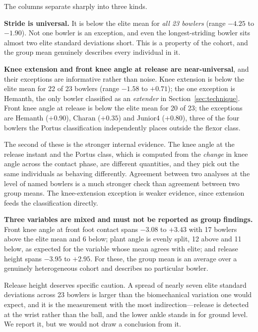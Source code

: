 \documentclass[11pt,a4paper]{article}
\begin{document}


The columns separate sharply into three kinds.

\textbf{Stride is universal.} It is below the elite mean for \emph{all 23
bowlers} (range $-4.25$ to $-1.90$). Not one bowler is an exception, and even
the longest-striding bowler sits almost two elite standard deviations short.
This is a property of the cohort, and the group mean genuinely describes every
individual in it.

\textbf{Knee extension and front knee angle at release are near-universal},
and their exceptions are informative rather than noise. Knee extension is below
the elite mean for 22 of 23 bowlers (range $-1.58$ to $+0.71$); the one
exception is Hemanth, the only bowler classified as an \emph{extender} in
Section~\ref{sec:technique}. Front knee angle at release is below the elite mean
for 20 of 23; the exceptions are Hemanth ($+0.90$), Charan ($+0.35$) and Junior4
($+0.80$), three of the four bowlers the Portus classification independently
places outside the flexor class.

The second of these is the stronger internal evidence. The knee angle at the
release instant and the Portus class, which is computed from the \emph{change}
in knee angle across the contact phase, are different quantities, and they
pick out the same individuals as behaving differently. Agreement between two
analyses at the level of named bowlers is a much stronger check than agreement
between two group means. The knee-extension exception is weaker evidence,
since extension feeds the classification directly.

\textbf{Three variables are mixed and must not be reported as group findings.}
Front knee angle at front foot contact spans $-3.08$ to $+3.43$ with 17 bowlers
above the elite mean and 6 below; plant angle is evenly split, 12 above and 11
below, as expected for the variable whose mean agrees with elite; and release
height spans $-3.95$ to $+2.95$. For these, the group mean is an average over a
genuinely heterogeneous cohort and describes no particular bowler.

Release height deserves specific caution. A spread of nearly seven elite
standard deviations across 23 bowlers is larger than the biomechanical
variation one would expect, and it is the measurement with the most
indirection---release is detected at the wrist rather than the ball, and the
lower ankle stands in for ground level. We report it, but we would not draw a
conclusion from it.
\end{document}
